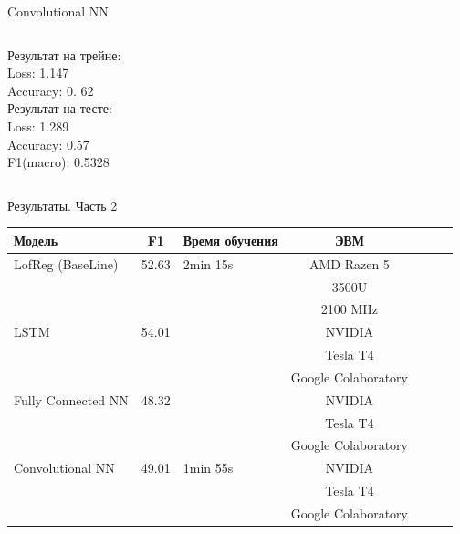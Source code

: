 \documentclass[c, aspectratio = 43]{beamer}
\begin{document}
\begin{frame}{Convolutional NN}
\begin{columns}
\begin{column}{0.5\textwidth}
                Результат на трейне:\\
                Loss: 1.147\\
                Accuracy: 0. 62\\

                Результат на тесте:\\
                Loss: 1.289\\
                Accuracy: 0.57\\
                F1(macro): 0.5328\\
            \end{column}

        \end{columns}


    \end{frame}
  \begin{frame}{Результаты. Часть 2}


\begin{table}[]\footnotesize
\begin{tabular}{lclclcl}
\hline
 Модель & F1 &Время обучения& ЭВМ \\
 \hline
 LofReg (BaseLine) & 52.63 & 2min 15s &AMD Razen 5 \\
 &&&3500U \\
 &&&2100 MHz\\
\hline
LSTM & 54.01 & &NVIDIA \\&&&
Tesla T4 \\
&&&Google Colaboratory\\
\hline
 Fully Connected NN & 48.32 & &NVIDIA  \\
 &&&Tesla T4 \\
&&&Google Colaboratory\\
\hline
Convolutional NN & 49.01 & 1min 55s &NVIDIA  \\
&&&Tesla T4 \\
&&&Google Colaboratory\\
\hline
\end{tabular}
\end{table}

\end{frame}
\end{document}
